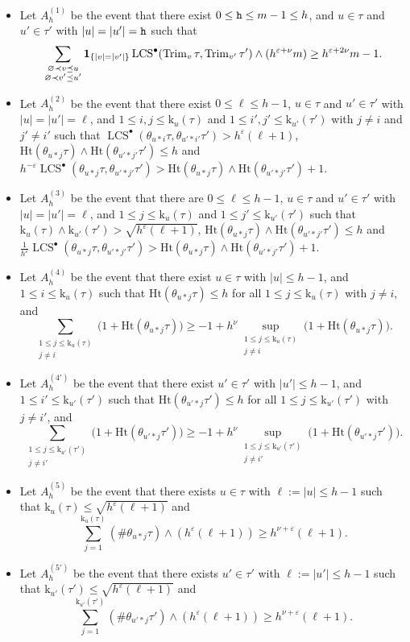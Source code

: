 \documentclass[11pt,reqno]{amsart}
\newcommand{\Ht}{\mathrm{Ht}}
\newcommand{\rk}{\mathrm{k}}
\newcommand{\Trim}{\operatorname{Trim}}
\newcommand{\LCS}{\operatorname{LCS}}
\begin{document}
\begin{itemize}
    \item Let $A_h^{(1)}$ be the event that there exist $0\leq \mathtt{h}\leq m-1\leq h$, and $u\in\tau$ and $u'\in\tau'$ with $|u|=|u'|=\mathtt{h}$ such that \[\sum_{\substack{\varnothing\prec v\preceq u\\ \varnothing\prec v'\preceq u'}}\I{|v|=|v'|}\LCS^\bullet(\Trim_v\tau,\Trim_{v'}\tau')\wedge (h^{\varepsilon+\nu} m)\geq h^{\varepsilon+2\nu}m-1.\]
    
    \item Let $A_h^{(2)}$ be the event that there exist $0\leq \ell \leq h-1$, $u\in\tau$ and $u'\in\tau'$ with $|u|=|u'|=\ell$, and $1\leq i,j\leq \rk_u(\tau)$ and $1\leq i',j'\leq \rk_{u'}(\tau')$ with $j\neq i$ and $j'\neq i'$ such that $\LCS^\bullet(\theta_{u*i}\tau,\theta_{u'*i'}\tau')> h^\varepsilon(\ell+1)$, $\Ht(\theta_{u*j}\tau)\wedge\Ht(\theta_{u'*j'}\tau')\leq h$ and $h^{-\varepsilon}\LCS^\bullet(\theta_{u*j}\tau,\theta_{u'*j'}\tau')> \Ht(\theta_{u*j}\tau)\wedge\Ht(\theta_{u'*j'}\tau')+1$.
    \item Let $A_h^{(3)}$ be the event that there are $0\leq \ell \leq h-1$, $u\in\tau$ and $u'\in\tau'$ with $|u|=|u'|=\ell$, and $1\leq j\leq \rk_u(\tau)$ and $1\leq j'\leq \rk_{u'}(\tau')$ such that $\rk_u(\tau)\wedge \rk_{u'}(\tau')> \sqrt{h^\varepsilon(\ell+1)}$, $\Ht(\theta_{u*j}\tau)\wedge\Ht(\theta_{u'*j'}\tau')\leq h$ and $\tfrac{1}{h^{\varepsilon}}\LCS^\bullet(\theta_{u*j}\tau,\theta_{u'*j'}\tau') > \Ht(\theta_{u*j}\tau)\wedge\Ht(\theta_{u'*j'}\tau') \!+\! 1$.
    \item Let $A_h^{(4)}$ be the event that there exist $u\in\tau$ with $|u|\leq h-1$, and $1\leq i\leq \rk_u(\tau)$ such that $\Ht(\theta_{u*j}\tau)\leq h$ for all $1\leq j\leq \rk_u(\tau)$ with $j\neq i$, and \[\sum_{\substack{1\leq j\leq \rk_u(\tau) \\ j\neq i}}\big(1+\Ht(\theta_{u*j}\tau)\big)\geq -1+h^\nu \sup_{\substack{1\leq j\leq \rk_u(\tau) \\ j\neq i}}\big(1+\Ht(\theta_{u*j}\tau)\big).\]
    \item Let $A_h^{(4')}$ be the event that there exist $u'\in\tau'$ with $|u'|\leq h-1$, and $1\leq i'\leq \rk_{u'}(\tau')$ such that $\Ht(\theta_{u'*j}\tau')\leq h$ for all $1\leq j\leq \rk_{u'}(\tau')$ with $j\neq i'$, and \[\sum_{\substack{1\leq j\leq \rk_{u'}(\tau') \\ j\neq i'}}\big(1+\Ht(\theta_{u'*j}\tau')\big)\geq -1+h^\nu \sup_{\substack{1\leq j\leq \rk_{u'}(\tau') \\ j\neq i'}}\big(1+\Ht(\theta_{u'*j}\tau')\big).\]
    \item Let $A_h^{(5)}$ be the event that there exists $u\in\tau$ with $\ell:=|u|\leq h-1$ such that $\rk_u(\tau)\leq \sqrt{h^\varepsilon(\ell+1)}$ and \[\sum_{j=1}^{\rk_u(\tau)} (\#\theta_{u*j}\tau)\wedge (h^\varepsilon (\ell+1))\geq h^{\nu+\varepsilon} (\ell+1).\]
    \item Let $A_h^{(5')}$ be the event that there exists $u'\in\tau'$ with $\ell:=|u'|\leq h-1$ such that $\rk_{u'}(\tau')\leq \sqrt{h^\varepsilon(\ell+1)}$ and \[\sum_{j=1}^{\rk_{u'}(\tau')}(\#\theta_{u'*j}\tau')\wedge(h^\varepsilon (\ell+1))\geq h^{\nu+\varepsilon} (\ell+1).\]
\end{itemize}
\end{document}
